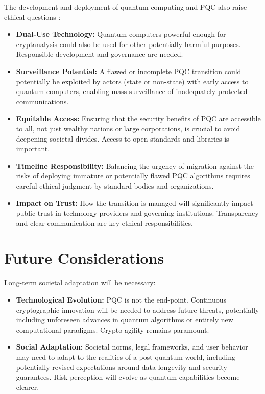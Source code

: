 The development and deployment of quantum computing and PQC also raise ethical questions \parencite{quantum_ethics_paper}:
\begin{itemize}
    \item \textbf{Dual-Use Technology:} Quantum computers powerful enough for cryptanalysis could also be used for other potentially harmful purposes. Responsible development and governance are needed.
    \item \textbf{Surveillance Potential:} A flawed or incomplete PQC transition could potentially be exploited by actors (state or non-state) with early access to quantum computers, enabling mass surveillance of inadequately protected communications.
    \item \textbf{Equitable Access:} Ensuring that the security benefits of PQC are accessible to all, not just wealthy nations or large corporations, is crucial to avoid deepening societal divides. Access to open standards and libraries is important.
    \item \textbf{Timeline Responsibility:} Balancing the urgency of migration against the risks of deploying immature or potentially flawed PQC algorithms requires careful ethical judgment by standard bodies and organizations.
    \item \textbf{Impact on Trust:} How the transition is managed will significantly impact public trust in technology providers and governing institutions. Transparency and clear communication are key ethical responsibilities.
\end{itemize}

\section{Future Considerations}\label{sec:future_ch9}

Long-term societal adaptation will be necessary:
\begin{itemize}
    \item \textbf{Technological Evolution:} PQC is not the end-point. Continuous cryptographic innovation will be needed to address future threats, potentially including unforeseen advances in quantum algorithms or entirely new computational paradigms. Crypto-agility remains paramount.
    \item \textbf{Social Adaptation:} Societal norms, legal frameworks, and user behavior may need to adapt to the realities of a post-quantum world, including potentially revised expectations around data longevity and security guarantees. Risk perception will evolve as quantum capabilities become clearer.
\end{itemize}

